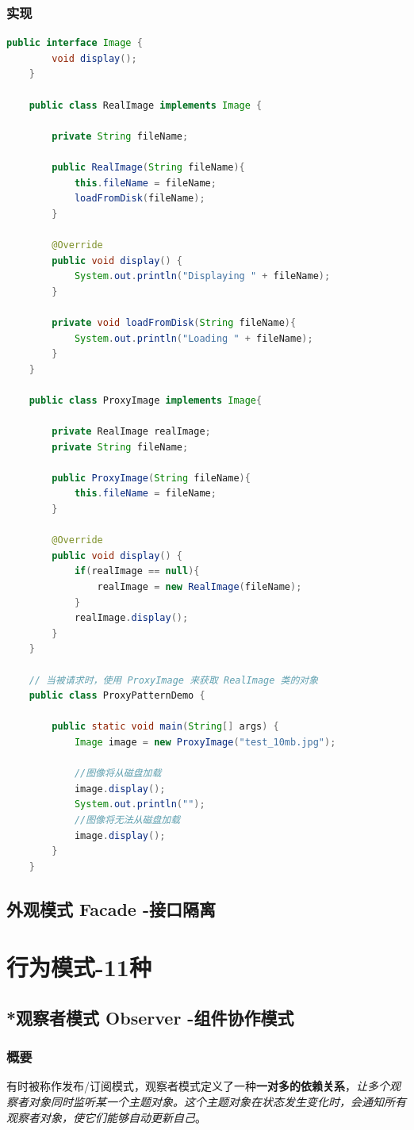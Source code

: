 \documentclass[UTF8,a4paper,12pt]{ctexbook}
\begin{document}
	\subsection{实现}
		\begin{lstlisting}[language = java]
	public interface Image {
		void display();
	}
	
	public class RealImage implements Image {
	
		private String fileName;
		
		public RealImage(String fileName){
			this.fileName = fileName;
			loadFromDisk(fileName);
		}
		
		@Override
		public void display() {
			System.out.println("Displaying " + fileName);
		}
		
		private void loadFromDisk(String fileName){
			System.out.println("Loading " + fileName);
		}
	}
	
	public class ProxyImage implements Image{
	
		private RealImage realImage;
		private String fileName;
		
		public ProxyImage(String fileName){
			this.fileName = fileName;
		}
		
		@Override
		public void display() {
			if(realImage == null){
				realImage = new RealImage(fileName);
			}
			realImage.display();
		}
	}
	
	// 当被请求时，使用 ProxyImage 来获取 RealImage 类的对象
	public class ProxyPatternDemo {
	
		public static void main(String[] args) {
			Image image = new ProxyImage("test_10mb.jpg");
			
			//图像将从磁盘加载
			image.display(); 
			System.out.println("");
			//图像将无法从磁盘加载
			image.display(); 	
		}
	}
		\end{lstlisting}
\newpage
\section{外观模式 Facade -接口隔离}	


\chapter{行为模式-11种}
\section{*观察者模式 Observer -组件协作模式}
	\subsection{概要}
		有时被称作发布/订阅模式，观察者模式定义了一种\textbf{一对多的依赖关系}，\textit{让多个观察者对象同时监听某一个主题对象。这个主题对象在状态发生变化时，会通知所有观察者对象，使它们能够自动更新自己}。
		
\end{document}
